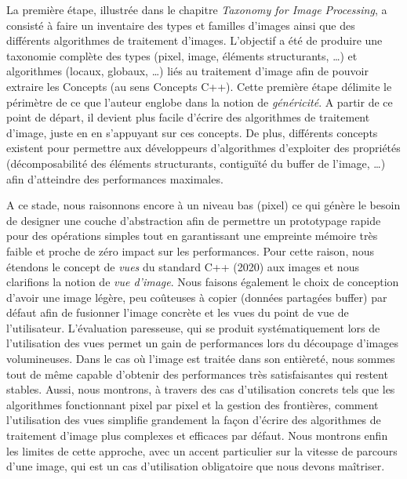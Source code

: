 La première étape, illustrée dans le chapitre \emph{Taxonomy for Image Processing}, a consisté à faire un inventaire des
types et familles d'images ainsi que des différents algorithmes de traitement d'images. L'objectif a été de produire une
taxonomie complète des types (pixel, image, éléments structurants, \ldots) et algorithmes (locaux, globaux, \ldots) liés
au traitement d'image afin de pouvoir extraire les Concepts (au sens Concepts C++). Cette première étape délimite le
périmètre de ce que l'auteur englobe dans la notion de \emph{généricité}. A partir de ce point de départ, il devient
plus facile d'écrire des algorithmes de traitement d'image, juste en en s'appuyant sur ces concepts. De plus, différents
concepts existent pour permettre aux développeurs d'algorithmes d'exploiter des propriétés (décomposabilité des éléments
structurants, contiguïté du buffer de l'image, \ldots) afin d'atteindre des performances maximales.

A ce stade, nous raisonnons encore à un niveau bas (pixel) ce qui génère le besoin de designer une couche d'abstraction
afin de permettre un prototypage rapide pour des opérations simples tout en garantissant une empreinte mémoire très
faible et proche de zéro impact sur les performances. Pour cette raison, nous étendons le concept de \emph{vues} du
standard C++ (2020) aux images et nous clarifions la notion de \emph{vue d'image}. Nous faisons également le choix de
conception d'avoir une image légère, peu coûteuses à copier (données partagées buffer) par défaut afin de fusionner
l'image concrète et les vues du point de vue de l'utilisateur. L'évaluation paresseuse, qui se produit systématiquement
lors de l'utilisation des vues permet un gain de performances lors du découpage d'images volumineuses. Dans le cas où
l'image est traitée dans son entièreté, nous sommes tout de même capable d'obtenir des performances très satisfaisantes
qui restent stables. Aussi, nous montrons, à travers des cas d'utilisation concrets tels que les algorithmes
fonctionnant pixel par pixel et la gestion des frontières, comment l'utilisation des vues simplifie grandement la façon
d'écrire des algorithmes de traitement d'image plus complexes et efficaces par défaut. Nous montrons enfin les limites
de cette approche, avec un accent particulier sur la vitesse de parcours d'une image, qui est un cas d'utilisation
obligatoire que nous devons maîtriser.

